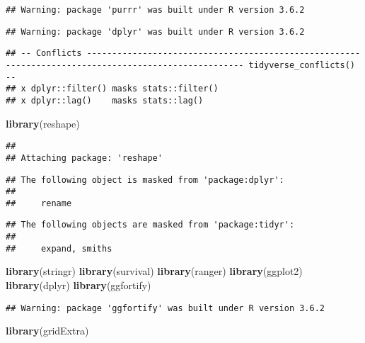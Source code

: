 \documentclass[]{article}
\newenvironment{Shaded}{\begin{snugshade}}{\end{snugshade}}
\newcommand{\KeywordTok}[1]{\textcolor[rgb]{0.13,0.29,0.53}{\textbf{#1}}}
\newcommand{\NormalTok}[1]{#1}
\begin{document}
\begin{verbatim}
## Warning: package 'purrr' was built under R version 3.6.2
\end{verbatim}

\begin{verbatim}
## Warning: package 'dplyr' was built under R version 3.6.2
\end{verbatim}

\begin{verbatim}
## -- Conflicts ----------------------------------------------------------------------------------------------------- tidyverse_conflicts() --
## x dplyr::filter() masks stats::filter()
## x dplyr::lag()    masks stats::lag()
\end{verbatim}

\begin{Shaded}
\begin{Highlighting}[]
\KeywordTok{library}\NormalTok{(reshape)}
\end{Highlighting}
\end{Shaded}

\begin{verbatim}
## 
## Attaching package: 'reshape'
\end{verbatim}

\begin{verbatim}
## The following object is masked from 'package:dplyr':
## 
##     rename
\end{verbatim}

\begin{verbatim}
## The following objects are masked from 'package:tidyr':
## 
##     expand, smiths
\end{verbatim}

\begin{Shaded}
\begin{Highlighting}[]
\KeywordTok{library}\NormalTok{(stringr)}
\KeywordTok{library}\NormalTok{(survival)}
\KeywordTok{library}\NormalTok{(ranger)}
\KeywordTok{library}\NormalTok{(ggplot2)}
\KeywordTok{library}\NormalTok{(dplyr)}
\KeywordTok{library}\NormalTok{(ggfortify)}
\end{Highlighting}
\end{Shaded}

\begin{verbatim}
## Warning: package 'ggfortify' was built under R version 3.6.2
\end{verbatim}

\begin{Shaded}
\begin{Highlighting}[]
\KeywordTok{library}\NormalTok{(gridExtra)}
\end{Highlighting}
\end{Shaded}
\end{document}
